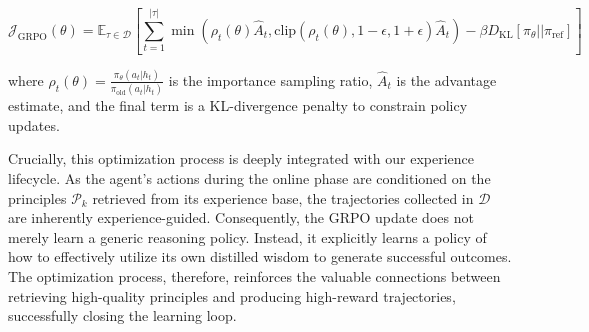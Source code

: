 \begin{equation}
\mathcal{J}_{\text{GRPO}}(\theta) = \mathbb{E}_{\tau \in \mathcal{D}} \left[ \sum_{t=1}^{|\tau|} \min \left( \rho_t(\theta) \hat{A}_t, \text{clip}(\rho_t(\theta), 1-\epsilon, 1+\epsilon) \hat{A}_t \right) - \beta D_{\text{KL}}[\pi_\theta || \pi_{\text{ref}}] \right]
\label{eq:grpo_objective}
\end{equation}


where $\rho_t(\theta) = \frac{\pi_\theta(a_t|h_t)}{\pi_{\text{old}}(a_t|h_t)}$ is the importance sampling ratio, $\hat{A}_t$ is the advantage estimate, and the final term is a KL-divergence penalty to constrain policy updates.


Crucially, this optimization process is deeply integrated with our experience lifecycle. As the agent's actions during the online phase are conditioned on the principles $\mathcal{P}_k$ retrieved from its experience base, the trajectories collected in $\mathcal{D}$ are inherently experience-guided. Consequently, the GRPO update does not merely learn a generic reasoning policy. Instead, it explicitly learns a policy of how to effectively utilize its own distilled wisdom to generate successful outcomes. The optimization process, therefore, reinforces the valuable connections between retrieving high-quality principles and producing high-reward trajectories, successfully closing the learning loop.

